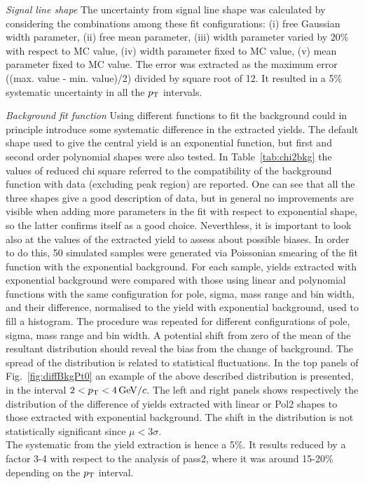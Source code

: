 \emph{Signal line shape}
The uncertainty from signal line shape was calculated by 
considering the combinations among these fit
configurations: (i) free Gaussian width parameter, (ii) free mean parameter, 
(iii) width parameter varied by 20\% with respect to MC value, (iv) width parameter 
fixed to MC value, (v) mean parameter fixed to MC value.
The error was extracted as the maximum error ((max. value - min. value)/2) divided by square root of 12.
It resulted in a 5\% systematic uncertainty in all the $p_{\rm T}$ intervals.

\emph{Background fit function}
Using different functions to fit the background could in 
principle introduce some systematic difference in the extracted yields.
The default shape used to give the central yield is an 
exponential function, but first and second 
order polynomial shapes were also tested. In Table~\ref{tab:chi2bkg} 
the values of reduced chi square referred to the compatibility 
of the background function with data (excluding peak region) are 
reported. One can see that all the three shapes 
give a good description of data, but in general no improvements 
are visible when adding more parameters in the fit
with respect to exponential shape, so the latter confirms itself as a good choice.
Neverthless, it is important to look also at the values of the 
extracted yield to assess about possible biases.
 In order to do this, 50 simulated samples were generated via 
 Poissonian smearing of the fit function with the exponential background.
 For each sample, yields extracted with exponential 
 background were compared with those using linear and 
 polynomial functions with the same
configuration for pole, sigma, mass range and bin width, and their
difference, normalised to the yield with exponential background, 
used to fill a histogram. The procedure was repeated for different
configurations of pole, sigma, mass range and bin width. 
A potential shift from zero of the mean of the resultant distribution 
 should reveal the bias from the change of background. The
  spread of the distribution is related to statistical fluctuations. 
  In the top panels of Fig.~\ref{fig:diffBkgPt0} an example of the above 
  described distribution is presented, in the interval $2 < p_{\rm T} < 4\, \mathrm{GeV}/c$.
  The left and right panels shows respectively the distribution of the difference
  of yields extracted with linear or Pol2 shapes to those extracted with exponential
  background. The shift in the distribution is not statistically significant 
 since $\mu < 3\sigma$.
 \\
The systematic from the yield extraction is hence a 5\%. 
It results reduced by a factor 3-4 with respect to the analysis of pass2,
where it was around 15-20\% depending on the $p_{\rm T}$ interval. 

